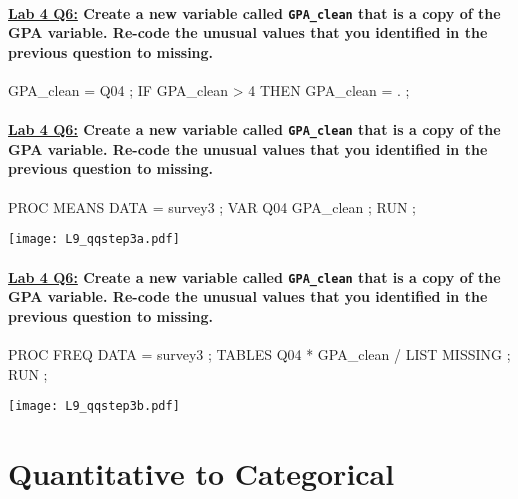 \begin{frame}[fragile]
\framesubtitle{\underline{Lab 4 Q6:} Create a new variable called \texttt{GPA\_clean} that is a copy of the GPA variable.  Re-code the unusual values that you identified in the previous question to missing. }
\footnotesize
\begin{code}{.0}
GPA_clean = Q04 ;
IF GPA_clean > 4 THEN GPA_clean = . ;
\end{code}
\emp
\end{frame}

\begin{frame}[fragile]
\framesubtitle{\underline{Lab 4 Q6:} Create a new variable called \texttt{GPA\_clean} that is a copy of the GPA variable.  Re-code the unusual values that you identified in the previous question to missing. }
\footnotesize
\begin{code}{.0}
PROC MEANS DATA = survey3 ;
	VAR Q04 GPA_clean ;
RUN ;
\end{code}
\emp
{} \hspace{1in} \emp
{}
\texttt{[image: L9\_qqstep3a.pdf]}
\emp
\end{frame}

\begin{frame}[fragile]
\framesubtitle{\underline{Lab 4 Q6:} Create a new variable called \texttt{GPA\_clean} that is a copy of the GPA variable.  Re-code the unusual values that you identified in the previous question to missing. }
\footnotesize
\begin{code}{.0}
PROC FREQ DATA = survey3 ;
   TABLES Q04 * GPA_clean /
   LIST MISSING ;
RUN ;
\end{code}
\emp
{} \hspace{1in} \emp
{}
\texttt{[image: L9\_qqstep3b.pdf]}
\emp
\end{frame}


\section[Quantitative to Categorical]{Quantitative to Categorical}
